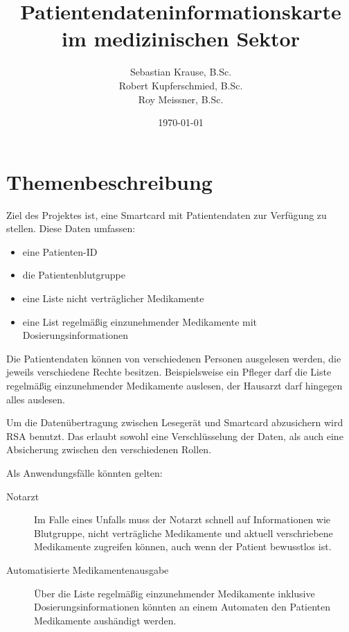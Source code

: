 \documentclass[parskip]{scrartcl}
\begin{document}
	\subject{Projektdokumentation im Fach Smartcard-Programmierung}
	\title{Patientendateninformationskarte im medizinischen Sektor}
	\author{Sebastian Krause, B.Sc.\\Robert Kupferschmied, B.Sc.\\Roy Meissner, B.Sc.}
	\date{\today}
	
	\maketitle
	
	\tableofcontents
	
	\newpage
	
	\section{Themenbeschreibung}
	Ziel des Projektes ist, eine Smartcard mit Patientendaten zur Verfügung zu stellen. Diese Daten umfassen:

	\begin{itemize}
	\item eine Patienten-ID
	\item die Patientenblutgruppe
	\item eine Liste nicht verträglicher Medikamente
	\item eine List regelmäßig einzunehmender Medikamente mit Dosierungsinformationen
	\end{itemize}
		
	Die Patientendaten können von verschiedenen Personen ausgelesen werden, die jeweils verschiedene Rechte besitzen. Beispielsweise ein Pfleger darf die Liste regelmäßig einzunehmender Medikamente auslesen, der Hausarzt darf hingegen alles auslesen.
	
	Um die Datenübertragung zwischen Lesegerät und Smartcard abzusichern wird RSA benutzt. Das erlaubt sowohl eine Verschlüsselung der Daten, als auch eine Absicherung zwischen den verschiedenen Rollen. 
	
Als Anwendungsfälle könnten gelten:

\begin{description}
\item[Notarzt] Im Falle eines Unfalls muss der Notarzt schnell auf Informationen wie Blutgruppe, nicht verträgliche Medikamente und aktuell verschriebene Medikamente zugreifen können, auch wenn der Patient bewusstlos ist. 
\item[Automatisierte Medikamentenausgabe] Über die Liste regelmäßig einzunehmender Medikamente inklusive Dosierungsinformationen könnten an einem Automaten den Patienten Medikamente aushändigt werden.
\end{description}
	
\end{document}
